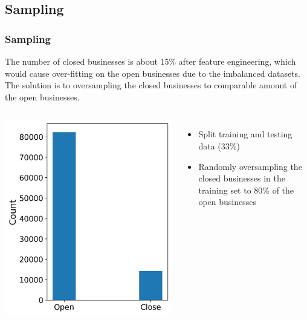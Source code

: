 \documentclass{beamer}
\begin{document}
\subsection{Sampling}
\begin{frame}
\frametitle{Sampling}
The number of closed businesses is about 15\% after feature engineering, which would cause over-fitting on the open businesses due to the imbalanced datasets. The solution is to oversampling the closed businesses to comparable amount of the open businesses. \vspace{1em}


\begin{columns}
	\includegraphics[width=.9\textwidth]{open_close_count}
	\begin{itemize}
		\item Split training and  testing data (33\%)
		\item Randomly oversampling the closed businesses in the training set to 80\% of the open businesses
	\end{itemize}
\end{columns}

\end{frame}
\end{document}
